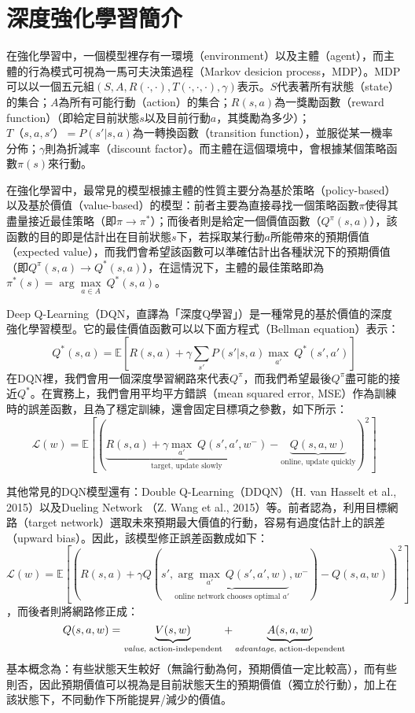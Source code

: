 \documentclass{article}
\begin{document}
\section{深度強化學習簡介}
在強化學習中，一個模型裡存有一環境（environment）以及主體（agent），而主體的行為模式可視為一馬可夫決策過程（Markov desicion process，MDP）。MDP可以以一個五元組$(S,A,R(\cdot,\cdot),T(\cdot, \cdot, \cdot),\gamma)$表示。$S$代表著所有狀態（state）的集合；$A$為所有可能行動（action）的集合；$R(s,a)$為一獎勵函數（reward function）（即給定目前狀態$s$以及目前行動$a$，其獎勵為多少）；$T（s,a,s'）=P(s'|s,a)$為一轉換函數（transition function），並服從某一機率分佈；$\gamma$則為折減率（discount factor）。而主體在這個環境中，會根據某個策略函數$\pi(s)$來行動。\par
在強化學習中，最常見的模型根據主體的性質主要分為基於策略（policy-based）以及基於價值（value-based）的模型：前者主要為直接尋找一個策略函數$\pi$使得其盡量接近最佳策略（即$\pi \rightarrow \pi^*$）；而後者則是給定一個價值函數（$Q^\pi (s,a)$），該函數的目的即是估計出在目前狀態$s$下，若採取某行動$a$所能帶來的預期價值（expected value），而我們會希望該函數可以準確估計出各種狀況下的預期價值（即$Q^\pi (s,a) \rightarrow Q^* (s,a)$），在這情況下，主體的最佳策略即為$\pi^*(s) = \arg \underset{a \in A}\max\ Q^*(s,a)$。\par
Deep Q-Learning（DQN，直譯為「深度Q學習」）是一種常見的基於價值的深度強化學習模型。它的最佳價值函數可以以下面方程式（Bellman equation）表示：
\[Q^*(s,a) = \mathbb{E}\left[R(s,a) + \gamma \sum_{s'}P(s'|s,a) \underset{a'}\max\ Q^*(s',a')\right]\]
在DQN裡，我們會用一個深度學習網路來代表$Q^\pi$，而我們希望最後$Q^\pi$盡可能的接近$Q^*$。在實務上，我們會用平均平方錯誤（mean squared error, MSE）作為訓練時的誤差函數，且為了穩定訓練，還會固定目標項之參數，如下所示：
\[\mathcal{L}(w) = \mathbb{E}\left[\left(\underbrace{R(s,a) + \gamma \underset{a'}\max\ Q(s',a', w^-)}_{\text{target, update slowly}} - \underbrace{Q(s,a,w)}_{\text{online, update quickly}}\right)^2\right]\]
\par
其他常見的DQN模型還有：Double Q-Learning（DDQN）（H. van Hasselt et al., 2015）\cite{DBLP:journals/corr/HasseltGS15}以及Dueling Network （Z. Wang et al., 2015）\cite{DBLP:journals/corr/WangFL15}等。前者認為，利用目標網路（target network）選取未來預期最大價值的行動，容易有過度估計上的誤差（upward bias）。因此，該模型修正誤差函數成如下：
\[\mathcal{L}(w) = \mathbb{E}\left[\left(R(s,a) + \gamma Q(s',\underbrace{\arg \underset{a'}\max\ Q(s',a',w)}_{\text{online network chooses optimal } a'}, w^-) - Q(s,a,w)\right)^2\right]\]，而後者則將網路修正成：
\[Q(s,a,w) = \underbrace{V(s,w)}_{\text{\emph{value}, action-independent}} + \underbrace{A(s,a,w)}_{\text{\emph{advantage}, action-dependent}}\]
基本概念為：有些狀態天生較好（無論行動為何，預期價值一定比較高），而有些則否，因此預期價值可以視為是目前狀態天生的預期價值（獨立於行動），加上在該狀態下，不同動作下所能提昇/減少的價值。
\end{document}
